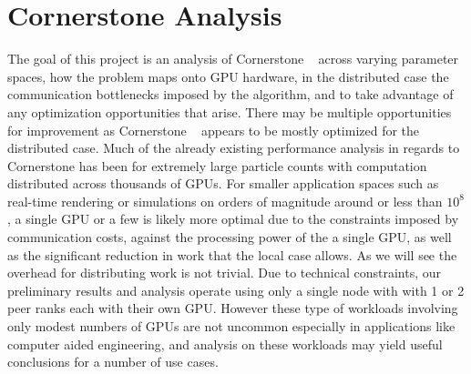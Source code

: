 \section{Cornerstone Analysis}
\label{sec:analysis}

The goal of this project is an analysis of Cornerstone ~\cite{cornerstone} across varying parameter spaces, how the problem maps onto GPU hardware, in the distributed case the communication bottlenecks imposed by the algorithm, and to take advantage of any optimization opportunities that arise. There may be multiple opportunities for improvement as Cornerstone ~\cite{cornerstone} appears to be mostly optimized for the distributed case. Much of the already existing performance analysis in regards to Cornerstone has been for extremely large particle counts with computation distributed across thousands of GPUs. For smaller application spaces such as real-time rendering or simulations on orders of magnitude around or less than $10^8$, a single GPU or a few is likely more optimal due to the constraints imposed by communication costs, against the processing power of the a single GPU, as well as the significant reduction in work that the local case allows. As we will see the overhead for distributing work is not trivial. Due to technical constraints, our preliminary results and analysis operate using only a single node with with 1 or 2 peer ranks each with their own GPU. However these type of workloads involving only modest numbers of GPUs are not uncommon especially in applications like computer aided engineering, and analysis on these workloads may yield useful conclusions for a number of use cases.

